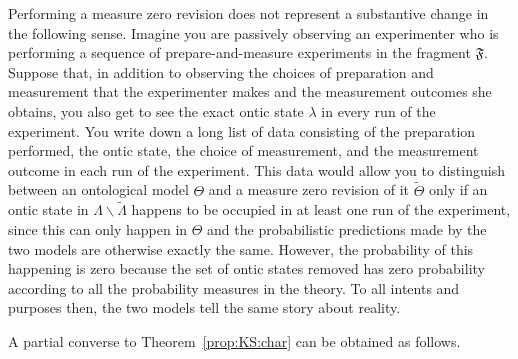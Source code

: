 \documentclass[DIV=calc,paper=a4,fontsize=11pt,twocolumn]{scrartcl} %
\theoremstyle{definition}
\theoremstyle{plain}
\begin{document}
Performing a measure zero revision does not represent a substantive
change in the following sense.  Imagine you are passively observing an
experimenter who is performing a sequence of prepare-and-measure
experiments in the fragment $\mathfrak{F}$.  Suppose that, in addition
to observing the choices of preparation and measurement that the
experimenter makes and the measurement outcomes she obtains, you also
get to see the exact ontic state $\lambda$ in every run of the
experiment.  You write down a long list of data consisting of the
preparation performed, the ontic state, the choice of measurement, and
the measurement outcome in each run of the experiment.  This data
would allow you to distinguish between an ontological model $\Theta$
and a measure zero revision of it $\tilde{\Theta}$ only if an ontic
state in $\Lambda \backslash \tilde{\Lambda}$ happens to be occupied
in at least one run of the experiment, since this can only happen in
$\Theta$ and the probabilistic predictions made by the two models are
otherwise exactly the same.  However, the probability of this
happening is zero because the set of ontic states removed has zero
probability according to all the probability measures in the theory.
To all intents and purposes then, the two models tell the same story
about reality.

A partial converse to Theorem~\ref{prop:KS:char} can be obtained
as follows.
\end{document}
